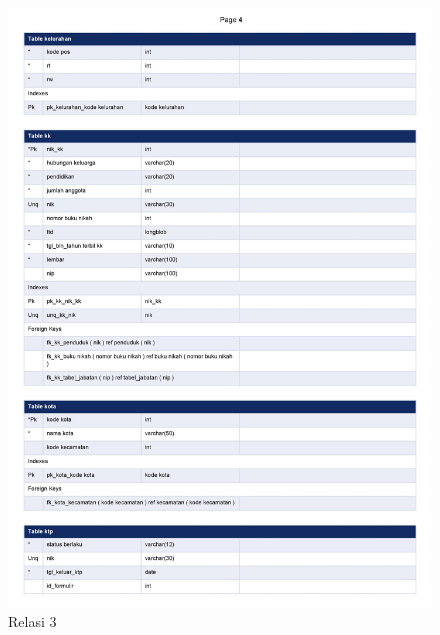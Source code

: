 \begin{figure}[H]
	\centering
	\includegraphics[width=12cm]{figures/0005.jpg}
	\caption{Relasi 3}
\end{figure}

